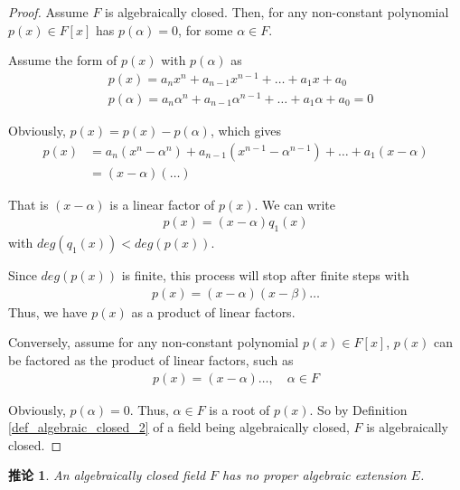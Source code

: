 \documentclass[utf8]{ctexbook}
\newtheorem{corollary}{推论}[section]
\begin{document}
\begin{proof}
Assume $F$ is algebraically closed. Then, for any non-constant polynomial $p(x) \in F[x]$ has $p(\alpha) = 0$, for some $\alpha \in F$.

Assume the form of $p(x)$ with $p(\alpha)$ as
\begin{align*}
& p(x) = a_n x^n + a_{n-1} x^{n-1} + \ldots + a_1 x + a_0 \\
& p(\alpha) = a_n \alpha^n + a_{n-1} \alpha^{n-1} + \ldots + a_1 \alpha + a_0 = 0
\end{align*}

Obviously, $p(x) = p(x) - p(\alpha)$, which gives
\begin{align*}
p(x) &= a_n (x^n - \alpha^n) + a_{n-1} (x^{n-1} - \alpha^{n-1} ) + \ldots + a_1 (x - \alpha) \\
&=(x-\alpha) (\ldots )
\end{align*}

That is $(x-\alpha)$ is a linear factor of $p(x)$. We can write
\begin{align*}
p(x) = (x-\alpha)q_1(x)
\end{align*}
with $deg(q_1(x)) < deg(p(x))$.

Since $deg(p(x))$ is finite, this process will stop after finite steps with
\begin{align*}
p(x) = (x-\alpha) (x - \beta) \ldots
\end{align*}
Thus, we have $p(x)$ as a product of linear factors.

Conversely, assume for any non-constant polynomial $p(x) \in F[x]$, $p(x)$ can be factored as the product of linear factors, such as
\begin{align*}
p(x) = (x-\alpha) \ldots, \quad \alpha \in F
\end{align*}

Obviously, $p(\alpha)=0$. Thus, $\alpha \in F$ is a root of $p(x)$. So by Definition \ref{def_algebraic_closed_2} of a field being algebraically closed, $F$ is algebraically closed.


\end{proof}


\begin{corollary}
\label{corollary_4_4_1_alge_closed_field_no_proper_extension}
An algebraically closed field $F$ has no proper algebraic extension $E$.
\end{corollary}
\end{document}
